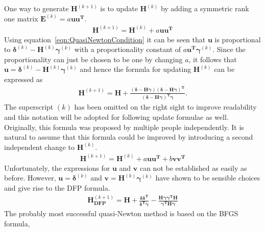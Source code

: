 One way to generate $\mathbf{H}^{(k+1)}$ is to update $\mathbf{H}^{(k)}$ by
adding a symmetric rank one matrix $\mathbf{E}^{(k)}=a\mathbf{uu^T}$.
%
\begin{align}
    \mathbf{H}^{(k+1)}=\mathbf{H}^{(k)}+a\mathbf{uu^T}
\end{align}
%
Using equation~\eqref{eqn:QuasiNewtonCondition} it can be seen that
$\mathbf{u}$ is proportional to
$\bm{\delta}^{(k)}-\mathbf{H}^{(k)}\bm{\gamma}^{(k)}$ with a proportionality
constant of $a\mathbf{u^T}\bm{\gamma}^{(k)}$. Since the proportionality can
just be chosen to be one by changing $a$, it follows that
$\mathbf{u}=\bm{\delta}^{(k)}-\mathbf{H}^{(k)}\bm{\gamma}^{(k)}$ and hence the
formula for updating $\mathbf{H}^{(k)}$ can be expressed as
%
\begin{align}
    \mathbf{H}^{(k+1)}=\mathbf{H}+\frac{(\bm{\delta}-\mathbf{H}\bm{\gamma})(\bm{\delta}-\mathbf{H}\bm{\gamma})^\mathbf{T}}{(\bm{\delta}-\mathbf{H}\bm{\gamma})^\mathbf{T}\bm{\gamma}}.\label{eqn:RankOneQuasiNewton}
\end{align}
%
The superscript $(k)$ has been omitted on the right sight to improve
readability and this notation will be adopted for following update formulae as well.
Originally, this formula was proposed by multiple people independently.
\autocite{Broyden_QuasiNewtonMethodstheir_1967,Davidon_VarianceAlgorithmMinimization_1968,Fiacco_NonlinearProgramming_1990}
It is natural to assume that this formula could be improved by introducing a
second independent change to $\mathbf{H}^{(k)}$.
%
\begin{align}
    \mathbf{H}^{(k+1)}=\mathbf{H}^{(k)}+a\mathbf{uu^T}+b\mathbf{vv^T}
\end{align}
%
Unfortunately, the expressions for $\mathbf{u}$ and $\mathbf{v}$ can not be
established as easily as before. However, $\mathbf{u}=\bm{\delta}^{(k)}$ and
$\mathbf{v}=\mathbf{H}^{(k)}\bm{\gamma}^{(k)}$ have shown to be sensible
choices and give rise to the \ac{DFP}
formula.\autocite{Davidon_VariableMetricMethod_1991,Fletcher_RapidlyConvergentDescent_1963}
%
\begin{align}
    \mathbf{H}_\mathbf{DFP}^{(k+1)}=\mathbf{H}+\frac{\bm{\delta\delta}^\mathbf{T}}{\bm{\delta}^\mathbf{T}\bm{\gamma}}-\frac{\mathbf{H}\bm{\gamma\gamma}^\mathbf{T}\mathbf{H}}{\bm{\gamma}^\mathbf{T}\mathbf{H}\bm{\gamma}}\label{eqn:DFPQuasiNewton}
\end{align}
%
The probably most successful quasi-Newton method is based on the \ac{BFGS}
formula,\autocite{Broyden_ConvergenceClassDoublerank_1970,Broyden_ConvergenceClassDoublerank_1970a,Fletcher_newapproachvariable_1970,Goldfarb_familyvariablemetricmethods_1970,Shanno_ConditioningquasiNewtonmethods_1970}

